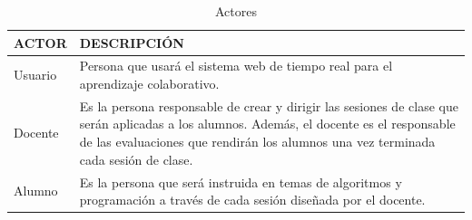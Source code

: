 \begin{longtable}{|L{3cm}|L{7cm}|}
	\caption{Actores}
	\label{tab:cap4_actores}\\
	\hline
	ACTOR & DESCRIPCIÓN \\
	\hline
	Usuario & Persona que usará el sistema web de tiempo real para el aprendizaje colaborativo.\\
	\hline
	Docente & Es la persona responsable de crear y dirigir las sesiones de clase que serán aplicadas a los alumnos. Además, el docente es el responsable de las evaluaciones que rendirán los alumnos una vez terminada cada sesión de clase.\\
	\hline
	Alumno & Es la persona que será instruida en temas de algoritmos y programación a través de cada sesión diseñada por el docente.\\
	\hline
\end{longtable}


